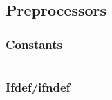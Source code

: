 \subsection{Preprocessors}

\subsubsection{Constants}
\begin{lstlisting}

\end{lstlisting}

\subsubsection{Ifdef/ifndef}
\begin{lstlisting}

\end{lstlisting}
